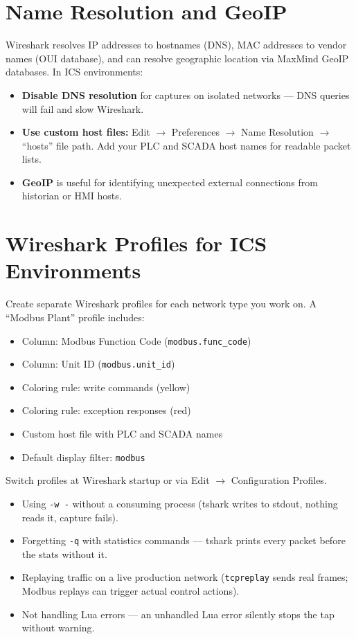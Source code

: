 \documentclass[12pt,twoside,openright]{memoir}
\newcommand{\filter}[1]{\texttt{\color{wsblue}#1}}
\begin{document}
\section{Name Resolution and GeoIP}

Wireshark resolves IP addresses to hostnames (DNS), MAC addresses to vendor names (OUI database), and can resolve geographic location via MaxMind GeoIP databases. In ICS environments:
\begin{itemize}[noitemsep]
  \item \textbf{Disable DNS resolution} for captures on isolated networks --- DNS queries will fail and slow Wireshark.
  \item \textbf{Use custom host files:} Edit $\to$ Preferences $\to$ Name Resolution $\to$ ``hosts'' file path. Add your PLC and SCADA host names for readable packet lists.
  \item \textbf{GeoIP} is useful for identifying unexpected external connections from historian or HMI hosts.
\end{itemize}

\section{Wireshark Profiles for ICS Environments}

Create separate Wireshark profiles for each network type you work on. A ``Modbus Plant'' profile includes:
\begin{itemize}[noitemsep]
  \item Column: Modbus Function Code (\filter{modbus.func\_code})
  \item Column: Unit ID (\filter{modbus.unit\_id})
  \item Coloring rule: write commands (yellow)
  \item Coloring rule: exception responses (red)
  \item Custom host file with PLC and SCADA names
  \item Default display filter: \filter{modbus}
\end{itemize}

Switch profiles at Wireshark startup or via Edit $\to$ Configuration Profiles.

\begin{commonmistakes}
\begin{itemize}[noitemsep]
  \item Using \texttt{-w -} without a consuming process (tshark writes to stdout, nothing reads it, capture fails).
  \item Forgetting \texttt{-q} with statistics commands --- tshark prints every packet before the stats without it.
  \item Replaying traffic on a live production network (\texttt{tcpreplay} sends real frames; Modbus replays can trigger actual control actions).
  \item Not handling Lua errors --- an unhandled Lua error silently stops the tap without warning.
\end{itemize}
\end{commonmistakes}
\end{document}
